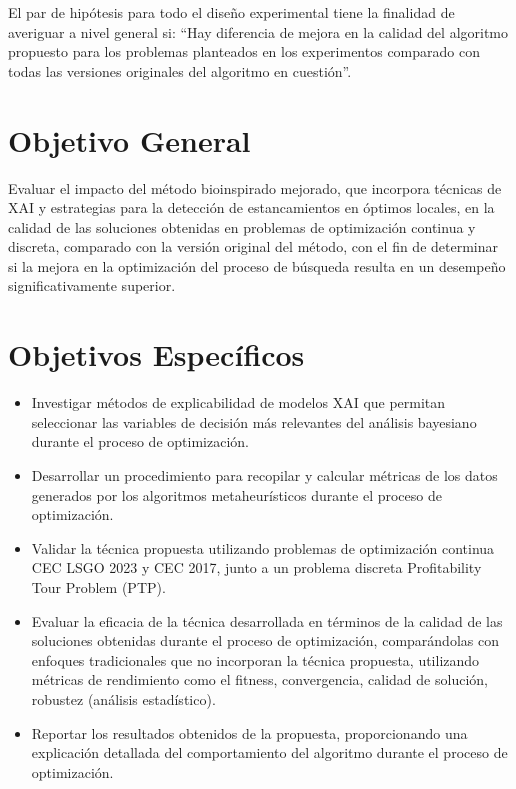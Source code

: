 El par de hipótesis para todo el diseño experimental tiene la finalidad de averiguar a nivel general si: ``Hay diferencia de mejora en la calidad del algoritmo propuesto para los problemas planteados en los experimentos comparado con todas las versiones originales del algoritmo en cuestión''.




\section{Objetivo General}
\label{sc:OG}
Evaluar el impacto del método bioinspirado mejorado, que incorpora técnicas de XAI y estrategias para la detección de estancamientos en óptimos locales, en la calidad de las soluciones obtenidas en problemas de optimización continua y discreta, comparado con la versión original del método, con el fin de determinar si la mejora en la optimización del proceso de búsqueda resulta en un desempeño significativamente superior.



\section{Objetivos Específicos}
\label{sc:OE}

\begin{itemize}
    \item Investigar métodos de explicabilidad de modelos XAI que permitan seleccionar las variables de decisión más relevantes del análisis bayesiano durante el proceso de optimización.
    \item Desarrollar un procedimiento para recopilar y calcular métricas de los datos generados por los algoritmos metaheurísticos durante el proceso de optimización.
    \item Validar la técnica propuesta utilizando problemas de optimización continua CEC LSGO 2023 y CEC 2017, junto a un problema discreta Profitability Tour Problem (PTP).
    \item Evaluar la eficacia de la técnica desarrollada en términos de la calidad de las soluciones obtenidas durante el proceso de optimización, comparándolas con enfoques tradicionales que no incorporan la técnica propuesta, utilizando métricas de rendimiento como el fitness, convergencia, calidad de solución, robustez (análisis estadístico).
    \item Reportar los resultados obtenidos de la propuesta, proporcionando una explicación detallada del comportamiento del algoritmo durante el proceso de optimización.
\end{itemize}
